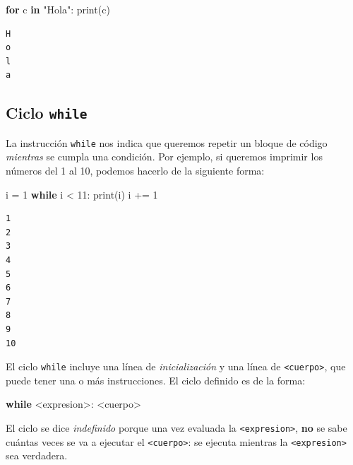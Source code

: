 \documentclass[
  letterpaper,
  DIV=11,
  numbers=noendperiod]{scrreprt}
\newenvironment{Shaded}{\begin{snugshade}}{\end{snugshade}}
\newcommand{\BuiltInTok}[1]{\textcolor[rgb]{0.00,0.23,0.31}{#1}}
\newcommand{\ControlFlowTok}[1]{\textcolor[rgb]{0.00,0.23,0.31}{\textbf{#1}}}
\newcommand{\DecValTok}[1]{\textcolor[rgb]{0.68,0.00,0.00}{#1}}
\newcommand{\KeywordTok}[1]{\textcolor[rgb]{0.00,0.23,0.31}{\textbf{#1}}}
\newcommand{\NormalTok}[1]{\textcolor[rgb]{0.00,0.23,0.31}{#1}}
\newcommand{\OperatorTok}[1]{\textcolor[rgb]{0.37,0.37,0.37}{#1}}
\newcommand{\StringTok}[1]{\textcolor[rgb]{0.13,0.47,0.30}{#1}}
\begin{document}
\begin{Shaded}
\begin{Highlighting}[]
\ControlFlowTok{for}\NormalTok{ c }\KeywordTok{in} \StringTok{"Hola"}\NormalTok{:}
    \BuiltInTok{print}\NormalTok{(c)}
\end{Highlighting}
\end{Shaded}

\begin{verbatim}
H
o
l
a
\end{verbatim}

\subsection{\texorpdfstring{Ciclo
\texttt{while}}{Ciclo while}}\label{ciclo-while}

La instrucción \texttt{while} nos indica que queremos repetir un bloque
de código \emph{mientras} se cumpla una condición. Por ejemplo, si
queremos imprimir los números del 1 al 10, podemos hacerlo de la
siguiente forma:

\begin{Shaded}
\begin{Highlighting}[]
\NormalTok{i }\OperatorTok{=} \DecValTok{1}
\ControlFlowTok{while}\NormalTok{ i }\OperatorTok{\textless{}} \DecValTok{11}\NormalTok{:}
    \BuiltInTok{print}\NormalTok{(i)}
\NormalTok{    i }\OperatorTok{+=} \DecValTok{1}
\end{Highlighting}
\end{Shaded}

\begin{verbatim}
1
2
3
4
5
6
7
8
9
10
\end{verbatim}

El ciclo \texttt{while} incluye una línea de \emph{inicialización} y una
línea de \texttt{\textless{}cuerpo\textgreater{}}, que puede tener una o
más instrucciones. El ciclo definido es de la forma:

\begin{Shaded}
\begin{Highlighting}[]
\ControlFlowTok{while} \OperatorTok{\textless{}}\NormalTok{expresion}\OperatorTok{\textgreater{}}\NormalTok{:}
    \OperatorTok{\textless{}}\NormalTok{cuerpo}\OperatorTok{\textgreater{}}
\end{Highlighting}
\end{Shaded}

El ciclo se dice \emph{indefinido} porque una vez evaluada la
\texttt{\textless{}expresion\textgreater{}}, \textbf{no} se sabe cuántas
veces se va a ejecutar el \texttt{\textless{}cuerpo\textgreater{}}: se
ejecuta mientras la \texttt{\textless{}expresion\textgreater{}} sea
verdadera.
\end{document}
